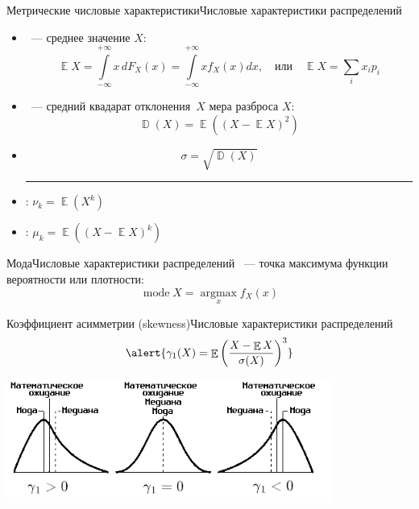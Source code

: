 \documentclass[11pt,pdf,utf8,hyperref={unicode},aspectratio=169]{beamer}
\DeclareMathOperator{\DD}{\mathbb{D}}
\DeclareMathOperator{\EE}{\mathbb{E}}
\DeclareMathOperator{\mmode}{mode}
\def\argmax#1{ \mathop{\text{argmax}}\limits_{#1} }
\begin{document}
\begin{frame}{Метрические числовые характеристики}{Числовые характеристики распределений}
	\begin{itemize}
		\item {}~--- среднее значение $X$:
		$$
            \EE{X} = \int\limits_{-\infty}^{+\infty} x \,dF_X(x) = \int\limits_{-\infty}^{+\infty} x f_X(x)dx, \quad\text{или}\quad \EE{X} = \sum_i x_ip_i
        $$
		\item {}~--- средний квадарат отклонения~$X$ мера разброса $X$:
		$$
            \DD(X) = \EE\left(\left(X-\EE{X}\right)^2\right)
        $$
        \item {}
        $$
            \sigma = \sqrt{\DD(X)}
        $$
        \hrule
        \item {}: $\nu_k = \EE(X^k)$
        \item {}: $\mu_k = \EE\left( \left(X-\EE{X}\right)^k\right)$
   \end{itemize}
\end{frame}
\begin{frame}{Мода}{Числовые характеристики распределений}
    ~--- точка максимума функции вероятности или плотности:
    $$
    \mmode X = \argmax{x} f_X(x)
    $$
\end{frame}
\begin{frame}{Коэффициент асимметрии (skewness)}{Числовые характеристики распределений}
	$$
        \alert{\gamma_1(X) = \EE\left( \frac{X-\EE{X}} {\sigma(X)} \right)^3}
    $$
    \bigskip
	\begin{center}
		\includegraphics[width=0.8\textwidth]{Skewness.png}
	\end{center}
\end{frame}
\end{document}
